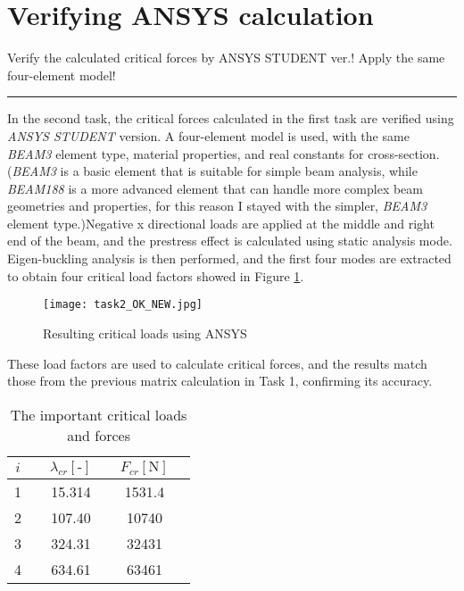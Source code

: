 \documentclass[12pt]{article}
\newcommand{\horrule}[1]{\rule{\linewidth}{#1}}
\begin{document}
\section{Verifying ANSYS calculation}
Verify the calculated critical forces by ANSYS STUDENT ver.! Apply the same four-element model!\\
\horrule{0.4pt}
\medskip


\noindent In the second task, the critical forces calculated in the first task are verified using \textit{ANSYS STUDENT} version. A four-element model is used, with the same \textit{BEAM3} element type, material properties, and real constants for cross-section. (\textit{BEAM3} is a basic element that is suitable for simple beam analysis, while \textit{BEAM188} is a more advanced element that can handle more complex beam geometries and properties, for this reason I stayed with the simpler, \textit{BEAM3} element type.)Negative x directional loads are applied at the middle and right end of the beam, and the prestress effect is calculated using static analysis mode. Eigen-buckling analysis is then performed, and the first four modes are extracted to obtain four critical load factors showed in Figure \ref{fig:KEP}. 

\begin{figure}[h]
\centering
\texttt{[image: task2\_OK\_NEW.jpg]}
\caption{Resulting critical loads using ANSYS}
\label{fig:KEP}
\end{figure}

These load factors are used to calculate critical forces, and the results match those from the previous matrix calculation in Task 1, confirming its accuracy.
\pagebreak

\begin{table}[h!]
\centering
\captionsetup{justification=centering,position=top} %
\caption{The important critical loads and forces} %
\label{tab:critical-loads-forces}
\begin{tabular}{cccccc}

$i$ && $\lambda_{cr} \left[ \text{-} \right]$ && $F_{cr} \left[ \text{N} \right]$ \\
\hline
1 && 15.314 &&  1531.4 \\
2 &&  107.40 &&  10740 \\
3 &&  324.31 &&  32431 \\
4 &&  634.61 &&  63461 \\

\end{tabular}
\end{table}
\end{document}
